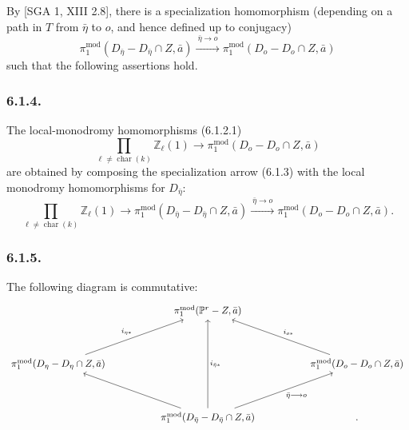 By [SGA 1, XIII 2.8], there is a specialization homomorphism (depending on
a path in $T$ from $\bar\eta$ to $o$, and hence defined up to conjugacy)
\begin{equation}\tag{6.1.3}
\pi_1^{\mathrm{mod}}(D_{\bar\eta}-D_{\bar\eta}\cap Z,\bar a)
\xrightarrow{\ \bar\eta\longrightarrow o\ }
\pi_1^{\mathrm{mod}}(D_o-D_o\cap Z,\bar a)
\end{equation}
such that the following assertions hold.

\subsubsection*{6.1.4.}
The local-monodromy homomorphisms (6.1.2.1)
\[
\prod_{\ell\ne\operatorname{char}(k)}\mathbb Z_\ell(1)
\longrightarrow
\pi_1^{\mathrm{mod}}(D_o-D_o\cap Z,\bar a)
\]
are obtained by composing the specialization arrow (6.1.3) with the local
monodromy homomorphisms for $D_{\bar\eta}$:
\begin{equation}\tag{6.1.4.1}
\prod_{\ell\ne\operatorname{char}(k)}\mathbb Z_\ell(1)
\longrightarrow
\pi_1^{\mathrm{mod}}(D_{\bar\eta}-D_{\bar\eta}\cap Z,\bar a)
\xrightarrow{\ \bar\eta\longrightarrow o\ }
\pi_1^{\mathrm{mod}}(D_o-D_o\cap Z,\bar a).
\end{equation}

\subsubsection*{6.1.5.}
The following diagram is commutative:
\begin{equation}\notag
\begin{tikzcd}[column sep=huge,row sep=huge]
{} & \pi_1^{\mathrm{mod}}(\mathbb P^r-Z,\bar a) & {} \\
\pi_1^{\mathrm{mod}}(D_\eta-D_\eta\cap Z,\bar a)
  \arrow[ur,"i_{\eta*}"]
& {}
& \pi_1^{\mathrm{mod}}(D_o-D_o\cap Z,\bar a)
  \arrow[ul,"i_{o*}"'] \\
{} & \pi_1^{\mathrm{mod}}(D_{\bar\eta}-D_{\bar\eta}\cap Z,\bar a)
  \arrow[uu,"i_{\bar\eta*}"']
  \arrow[ul]
  \arrow[ur,"\bar\eta\longrightarrow o"'] & {} .
\end{tikzcd}
\end{equation}

